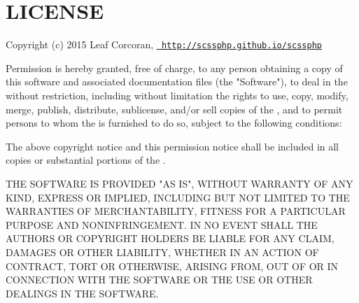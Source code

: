 \chapter{LICENSE}
\hypertarget{md_public_2glpi_2vendor_2scssphp_2scssphp_2_l_i_c_e_n_s_e}{}\label{md_public_2glpi_2vendor_2scssphp_2scssphp_2_l_i_c_e_n_s_e}
Copyright (c) 2015 Leaf Corcoran, \href{http://scssphp.github.io/scssphp}{\texttt{ http\+://scssphp.\+github.\+io/scssphp}}

Permission is hereby granted, free of charge, to any person obtaining a copy of this software and associated documentation files (the "{}\+Software"{}), to deal in the  without restriction, including without limitation the rights to use, copy, modify, merge, publish, distribute, sublicense, and/or sell copies of the , and to permit persons to whom the  is furnished to do so, subject to the following conditions\+:

The above copyright notice and this permission notice shall be included in all copies or substantial portions of the .

THE SOFTWARE IS PROVIDED "{}\+AS IS"{}, WITHOUT WARRANTY OF ANY KIND, EXPRESS OR IMPLIED, INCLUDING BUT NOT LIMITED TO THE WARRANTIES OF MERCHANTABILITY, FITNESS FOR A PARTICULAR PURPOSE AND NONINFRINGEMENT. IN NO EVENT SHALL THE AUTHORS OR COPYRIGHT HOLDERS BE LIABLE FOR ANY CLAIM, DAMAGES OR OTHER LIABILITY, WHETHER IN AN ACTION OF CONTRACT, TORT OR OTHERWISE, ARISING FROM, OUT OF OR IN CONNECTION WITH THE SOFTWARE OR THE USE OR OTHER DEALINGS IN THE SOFTWARE. 